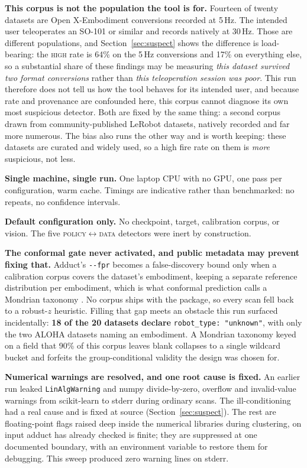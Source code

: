 \documentclass[10pt,a4paper]{article}
\newcommand{\dtr}[1]{\texttt{\small #1}}
\begin{document}
\textbf{This corpus is not the population the tool is for.} Fourteen of twenty datasets are
Open X-Embodiment conversions recorded at 5\,Hz. The intended user teleoperates an SO-101 or
similar and records natively at 30\,Hz. Those are different populations, and
Section~\ref{sec:suspect} shows the difference is load-bearing: the \textsc{high} rate is
64\% on the 5\,Hz conversions and 17\% on everything else, so a substantial share of these
findings may be measuring \emph{this dataset survived two format conversions} rather than
\emph{this teleoperation session was poor}. This run therefore does not tell us how the tool
behaves for its intended user, and because rate and provenance are confounded here, this
corpus cannot diagnose its own most suspicious detector. Both are fixed by the same thing: a
second corpus drawn from community-published LeRobot datasets, natively recorded and far
more numerous. The bias also runs the other way and is worth keeping: these datasets are
curated and widely used, so a high fire rate on them is \emph{more} suspicious, not less.

\textbf{Single machine, single run.} One laptop CPU with no GPU, one pass per configuration,
warm cache. Timings are indicative rather than benchmarked: no repeats, no confidence
intervals.

\textbf{Default configuration only.} No checkpoint, target, calibration corpus, or vision.
The five \textsc{policy}$\leftrightarrow$\textsc{data} detectors were inert by construction.

\textbf{The conformal gate never activated, and public metadata may prevent fixing that.}
Adduct's \texttt{-{}-fpr} becomes a false-discovery bound only when a calibration corpus
covers the dataset's embodiment, keeping a separate reference distribution per embodiment, which is what conformal prediction calls a Mondrian taxonomy \cite{vovk}. No
corpus ships with the package, so every scan fell back to a robust-$z$ heuristic. Filling
that gap meets an obstacle this run surfaced incidentally: \textbf{18 of the 20 datasets
declare} \mbox{\texttt{robot\_type:\,"unknown"}}, with only the two ALOHA datasets naming an
embodiment. A Mondrian taxonomy keyed on a field that 90\% of this corpus leaves blank
collapses to a single wildcard bucket and forfeits the group-conditional validity the design
was chosen for.

\textbf{Numerical warnings are resolved, and one root cause is fixed.} An earlier run leaked
\dtr{LinAlgWarning} and numpy divide-by-zero, overflow and invalid-value warnings from
scikit-learn to stderr during ordinary scans. The ill-conditioning had a real cause and is
fixed at source (Section~\ref{sec:suspect}). The rest are floating-point flags raised deep inside the
numerical libraries during clustering, on input adduct has already checked is finite; they
are suppressed at one documented boundary, with an environment variable to restore them for
debugging. This sweep
produced zero warning lines on stderr.
\end{document}
